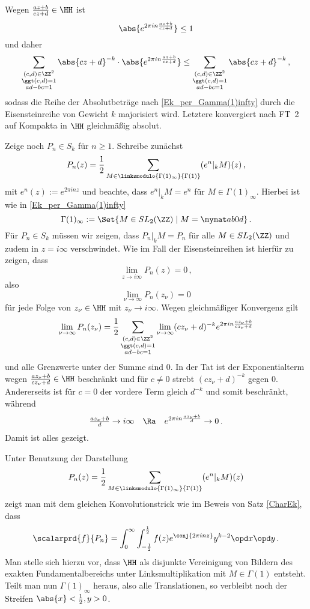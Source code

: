 \begin{bewe-list}
\item Wegen $\frac{az+b}{cz+d} \in \HH$ ist
\[
	\abs{e^{2\pi i n \frac{az+b}{cz+d}}} \leq 1
\]
und daher 
\[
	\sum_{\substack{(c,d)\in\ZZ^2 \\ \ggt(c,d) = 1 \\ ad-bc = 1}} \abs{cz+d}^{-k} \cdot \abs{e^{2\pi i n \frac{az+b}{cz+d}}} \leq \sum_{\substack{(c,d)\in\ZZ^2 \\ \ggt(c,d) = 1 \\ ad-bc = 1}} \abs{cz+d}^{-k}
	\,,
\]
sodass die Reihe der Absolutbeträge nach \ref{Ek_per_Gamma(1)infty} durch die Eisensteinreihe von Gewicht $k$ majorisiert wird. Letztere konvergiert nach FT~2 auf Kompakta in $\HH$ gleichmäßig absolut.

Zeige noch $P_n \in S_k$ für $n \geq 1$. Schreibe zunächst
\[
	P_n(z) = \frac 12 \sum_{M \in \linksmodulo{\Gamma(1)_\infty}{\Gamma(1)}} (e^n |_k M)(z)
	\,,
\]
mit $e^n(z) := e^{2 \pi inz}$ und beachte, dass $e^n |_k M = e^n$ für $M \in \Gamma(1)_\infty$. Hierbei ist wie in \ref{Ek_per_Gamma(1)infty} 
\[
	\Gamma(1)_\infty := \Set{M \in SL_2(\ZZ) \mid M = \mymat ab0d}
	\,.
\]	
Für $P_n \in S_k$ müssen wir zeigen, dass $P_n |_k M = P_n$ für alle $M \in SL_2(\ZZ)$ und zudem in $z = i \infty$ verschwindet. Wie im Fall der Eisensteinreihen ist hierfür zu zeigen, dass 
\[
	\lim_{z \to i\infty} P_n(z) = 0
	\,,
\]
also
\[
	\lim_{\nu \to \infty} P_n(z_\nu) = 0
\]
für jede Folge von $z_\nu \in \HH$ mit $z_\nu \to i\infty$. Wegen gleichmäßiger Konvergenz gilt
\[
	\lim_{\nu \to \infty} P_n(z_\nu) = \frac 12 \sum_{\substack{(c,d)\in\ZZ^2 \\ \ggt(c,d) = 1 \\ ad-bc = 1}} \lim_{\nu \to \infty} (cz_\nu + d)^{-k} e^{2\pi in \frac{az_\nu + b}{cz_\nu + d}}
\]
und alle Grenzwerte unter der Summe sind 0. In der Tat ist der Exponentialterm wegen $\frac{az_\nu + b}{cz_\nu + d} \in \HH$ beschränkt und für $c \neq 0$ strebt $(cz_\nu + d)^{-k}$ gegen 0. Andererseits ist für $c = 0$ der vordere Term gleich $d^{-k}$ und somit beschränkt, während
\[
	\tfrac{az_\nu + b}{d} \to i\infty \quad \Ra \quad e^{2\pi in \frac{az_\nu + b}{d}} \to 0
	\,.
\]
Damit ist alles gezeigt.

\item Unter Benutzung der Darstellung
\[
	P_n(z) = \frac 12 \sum_{M \in \linksmodulo{\Gamma(1)_\infty}{\Gamma(1)}} (e^n |_k M)(z)
\]
zeigt man mit dem gleichen \glqq{}Konvolutionstrick\grqq{} wie im Beweis von Satz \ref{CharEk}, dass
\[
	\scalarprd {f}{P_n} = \int_0^\infty \int_{-\frac 12}^{\frac 12} f(z) e^{\conj{2\pi inz}} y^{k-2} \opd x \opd y
	\,.
\]
Man stelle sich hierzu vor, dass $\HH$ als disjunkte Vereinigung von Bildern des exakten Fundamentalbereichs unter Linksmultiplikation mit $M \in \Gamma(1)$ entsteht. Teilt man nun $\Gamma(1)_\infty$ heraus, also alle Translationen, so verbleibt noch der Streifen $\abs{x} < \frac 12, y > 0$. 


\end{bewe-list}
